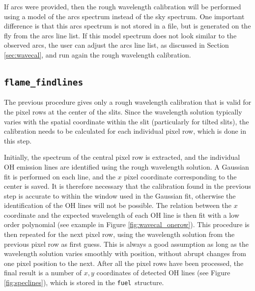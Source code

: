 \documentclass[a4paper]{article}
\newcommand{\fuel}{\texttt{fuel}}
\begin{document}
\begin{sloppypar}
If arcs were provided, then the rough wavelength calibration will be performed using a model of the arcs spectrum instead of the sky spectrum. One important difference is that this arcs spectrum is not stored in a file, but is generated on the fly from the arcs line list. If this model spectrum does not look similar to the observed arcs, the user can adjust the arcs line list, as discussed in Section \ref{sec:wavecal}, and run again the rough wavelength calibration.



\subsection{\texttt{flame\_findlines}}
\label{sec:findlines}


The previous procedure gives only a rough wavelength calibration that is valid for the pixel rows at the center of the slits. Since the wavelength solution typically varies with the spatial coordinate within the slit (particularly for tilted slits), the calibration needs to be calculated for each individual pixel row, which is done in this step.

Initially, the spectrum of the central pixel row is extracted, and the individual OH emission lines are identified using the rough wavelength solution. A Gaussian fit is performed on each line, and the $x$ pixel coordinate corresponding to the center is saved. It is therefore necessary that the calibration found in the previous step is accurate to within the window used in the Gaussian fit, otherwise the identification of the OH lines will not be possible. The relation between the $x$ coordinate and the expected wavelength of each OH line is then fit with a low order polynomial (see example in Figure \ref{fig:wavecal_onerow}). This procedure is then repeated for the next pixel row, using the wavelength solution from the previous pixel row as first guess. This is always a good assumption as long as the wavelength solution varies smoothly with position, without abrupt changes from one pixel position to the next. After all the pixel rows have been processed, the final result is a number of $x,y$ coordinates of detected OH lines (see Figure \ref{fig:speclines}), which is stored in the \fuel\ structure.


\end{sloppypar}
\end{document}
